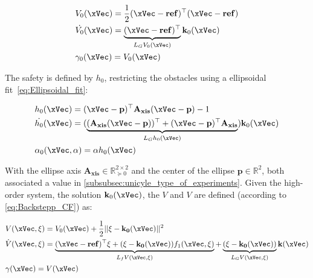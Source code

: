 \begin{subequations}
   \begin{align}
    &V_0(\xVec) = \frac{1}{2}(\xVec-\mathbf{ref})^{\top}(\xVec-\mathbf{ref}) \label{eq:V0_unicycle} \\
    &\dot{V_0}(\xVec) = \underbrace{(\xVec-\mathbf{ref})^{\top}}_{L_GV_0(\xVec)}\mathbf{k}_0(\xVec)  \label{eq:dot_V0_unicycle} \\
    &\gamma_0(\xVec)  = V_0(\xVec) \label{eq:CLF_gamma0_unicycle}
\end{align}
\label{eq:CLF0_unicycle}
\end{subequations}


The safety is defined by  \(h_0\), restricting the obstacles using a ellipsoidal fit~\ref{eq:Ellipsoidal_fit}:

\begin{subequations}
   \begin{align}
    &h_0(\xVec) = (\xVec-\mathbf{p})^{\top}\mathbf{A_{xis}}(\xVec-\mathbf{p}) - 1 \label{eq:h0_orbital} \\
    &\dot{h_0}(\xVec) = (\underbrace{(\mathbf{A_{xis}}(\xVec-\mathbf{p}))^{\top} + (\xVec-\mathbf{p})^{\top}\mathbf{A_{xis}}}_{L_Gh_0(\xVec)})\mathbf{k}_0(\xVec)  \label{eq:dot_h0_unicycle} \\
    &\alpha_0(\xVec, \alpha)  = \alpha h_0(\xVec) \label{eq:CBF_alpha0_orbital}
\end{align}
\label{eq:CBF0_orbital}
\end{subequations}


With the ellipse axis \(\mathbf{A_{xis}} \in \mathbb{R}^{2 \times 2}_{\succeq 0}\)  and the center of the ellipse \(\mathbf{p} \in \mathbb{R}^2\), both associated a value in \ref{subsubsec:unicyle_type_of_experiments}. Given the high-order system, the solution \(\mathbf{k}_0(\xVec)\), the  \(V\) and  \(V\) are defined (according to \ref{eq:Backstepp_CF}) as:


\begin{subequations}
   \begin{align}
    &V(\xVec, \xi) = V_0(\xVec) + \frac{1}{2} || \xi - \mathbf{k_0(\xVec)}||^2 \label{eq:V_orbital} \\
    &\dot{V}(\xVec, \xi) = \underbrace{(\xVec-\mathbf{ref})^{\top}\xi + (\xi - \mathbf{k_0(\xVec)})f_1(\xVec, \xi)}_{L_fV(\xVec, \xi)} + \underbrace{(\xi - \mathbf{k_0(\xVec)})}_{L_GV(\xVec, \xi)} \mathbf{k}(\xVec)  \label{eq:dot_V_orbital} \\
    &\gamma(\xVec)  = V(\xVec) \label{eq:CLF_gamma_orbital}
\end{align}
\label{eq:CLF_orbital}
\end{subequations}


